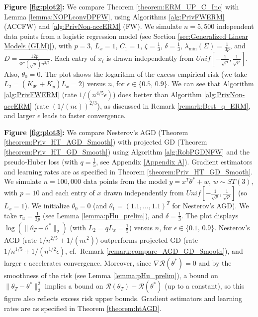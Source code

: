 \documentclass{article}
\begin{document}
\textbf{Figure \ref{fig:plot2}:} We compare Theorem \ref{theorem:ERM_UP_C_Inc} with Lemma \ref{lemma:NOPLconvDPFW}, using Algorithms \ref{alg:PrivFWERM} (ACCFW) and \ref{alg:PrivNon-accERM} (FW). We simulate $n = 5,500$ independent data points from a logistic regression model (see Section \ref{sec:Generalized Linear Models (GLM)}), with $p = 3$, $L_x = 1$, $C_1 = 1$, $\zeta = \frac{1}{3}$, $\delta = \frac{1}{3}$, $\lambda_{\min}(\Sigma) = \frac{1}{3p}$, and $D = \frac{12p}{\Phi''(\sqrt{p})n^{2/5}}$. Each entry of $x_i$ is drawn independently from $Unif\left[-\frac{1}{\sqrt{p}}, \frac{1}{\sqrt{p}}\right]$. Also, $\theta_0 = 0$. The plot shows the logarithm of the excess empirical risk (we take $L_2 = (K_{\Phi'} + K_y)L_x = 2$) versus $n$, for $\epsilon\in\{0.5,\,0.9\}$. We can see that Algorithm \ref{alg:PrivFWERM} (rate $1/(n^{4/5}\epsilon)$) does better than Algorithm \ref{alg:PrivNon-accERM} (rate $(1/(n\epsilon))^{2/3}$), as discussed in Remark \ref{remark:Best_q_ERM}, and larger $\epsilon$ leads to faster convergence.

\textbf{Figure \ref{fig:plot3}:} We compare Nesterov’s AGD (Theorem \ref{theorem:Priv_HT_AGD_Smooth}) with projected GD (Theorem \ref{theorem:Priv_HT_GD_Smooth}) using Algorithm \ref{alg:RobPGDNFW} and the pseudo-Huber loss (with $q = \frac{1}{5}$, see Appendix \ref{Appendix A}). Gradient estimators and learning rates are as specified in Theorem \ref{theorem:Priv_HT_GD_Smooth}. We simulate $n = 100,000$ data points from the model $y = x^T\theta^* + w$, $w \sim ST(3)$, with $p = 10$ and each entry of $x$ drawn independently from $Unif\left[-\tfrac{1}{\sqrt{p}},\tfrac{1}{\sqrt{p}}\right]$ (so $L_x = 1$). We initialize $\theta_0 = 0$ (and $\theta_1 = (1.1, \dots, 1.1)^T$ for Nesterov's AGD). We take $\tau_u = \frac{1}{3p}$ (see Lemma \ref{lemma:pHu_prelim}), and $\delta = \frac{1}{3}$. The plot displays $\log(\|\theta_T-\theta^*\|_2)$ (with $L_2 = qL_x = \frac{1}{5}$) versus $n$, for $\epsilon \in \{0.1,\,0.9\}$. Nesterov’s AGD (rate $1/n^{2/5} + 1/(n\epsilon^2)$) outperforms projected GD (rate $1/n^{1/5} + 1/(n^{1/2}\epsilon)$, cf.\ Remark \ref{remark:compare_AGD_GD_Smooth}), and larger $\epsilon$ accelerates convergence. Moreover, since $\nabla\mathcal{R}(\theta^*) = 0$ and by the smoothness of the risk (see Lemma \ref{lemma:pHu_prelim}), a bound on $\|\theta_T-\theta^*\|_2^2$ implies a bound on $\mathcal{R}(\theta_T)-\mathcal{R}(\theta^*)$ (up to a constant), so this figure also reflects excess risk upper bounds. Gradient estimators and learning rates are as specified in Theorem \ref{theorem:htAGD}. 
\end{document}
